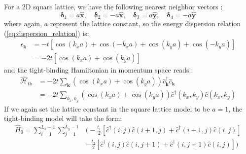 \documentclass[11pt, a4paper, oneside]{book}
\theoremstyle{definition} %
\begin{document}
For a 2D square lattice, we have the following nearest neighbor vectors \cite{Utermohlen}:
\begin{equation}
	\bm{\delta}_1 = a \hat{\mathbf{x}}, \quad \bm{\delta}_2 = -a \hat{\mathbf{x}}, \quad \bm{\delta}_3 = a \hat{\mathbf{y}}, \quad \bm{\delta}_4 = -a \hat{\mathbf{y}}
\end{equation}
where again, $a$ represent the lattice constant, so the energy dispersion relation (\ref{eq:dispersion_relation})  is:
\begin{equation}
	\begin{split}
		\epsilon_{\mathbf{k}} &= -t \left[\cos(k_x a) + \cos(-k_x a) + \cos(k_y a) + \cos(-k_y a) \right] \\
		&= -2t\left[\cos(k_x a) + \cos(k_y a) \right]
	\end{split}
\end{equation}
and the tight-binding Hamiltonian in momentum space reads:
\begin{equation}
\begin{split}
	\hat{\mathcal{H}}_{\text{tb}} &= -2t\sum_{\mathbf{k}} (\cos(k_xa) + \cos(k_ya))\hat{c}^\dagger_{\mathbf{k}}\hat{c}_{\mathbf{k}}\\
	&= -2t\sum_{k_x, k_y} (\cos(k_xa) + \cos(k_ya))\hat{c}^\dagger(k_x, k_y)\hat{c}(k_x, k_y)
\end{split}
\end{equation}
If we again set the lattice constant in the square lattice model to be $a= 1$, the tight-binding model will take the form:
\begin{equation}
\begin{split}
\hat{H}_0 =  \sum_{i = 1}^{L_x-1} \sum_{j=1}^{L_y-1}& \Big( -\frac{t_1}{2} \left[ \hat{c}^\dagger(i, j) \hat{c}(i+1, j) + \hat{c}^\dagger(i+1, j)\hat{c}(i, j) \right] \\
	&-\frac{t_2}{2} \left[\hat{c}^\dagger(i,j) \hat{c}(i,j+1) + \hat{c}^\dagger(i, j+1)\hat{c}(i,j) \right] \Big) \\
\end{split}
\label{eq:tight_binding_2d_Hamiltonian}
\end{equation}


	
\end{document}
